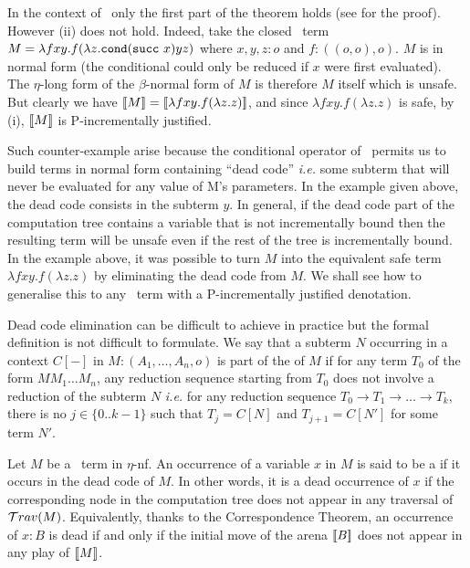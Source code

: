 In the context of \pcf\, only the first part of the theorem holds (see \cite{blumtransfer} for the proof). However (ii) does not hold. Indeed, take the closed \pcf\ term $M = \lambda f x y. f (\lambda z. \texttt{cond} (\texttt{succ}\ x) y z )$ where $x,y,z:o$ and $f:((o,o),o)$. $M$ is in normal form (the conditional  could  only be reduced if $x$ were first evaluated). The $\eta$-long form of the $\beta$-normal form of $M$ is therefore $M$ itself which is unsafe.
But clearly we have ${[\![ M ]\!]} = {[\![ \lambda f x y. f (\lambda z. z) ]\!]}$, and since  $\lambda f x y. f (\lambda z. z)$ is safe, by (i), ${[\![ M ]\!]}$ is P-incrementally justified.

Such counter-example arise because the conditional operator of \pcf\ permits us to build terms in normal form containing ``dead code'' {\it i.e.} some  subterm that will never be evaluated for any value of M's parameters. In the example given above, the dead code consists in the subterm $y$. In general, if the dead code part of the computation tree contains a variable that is not incrementally bound then the resulting term will be unsafe even if the rest of the tree is incrementally bound.
In the example above, it was possible to turn $M$ into the equivalent safe term $\lambda f x y. f (\lambda z. z)$ by eliminating the dead code from $M$.
We shall see how to generalise this to any \pcf\ term with a P-incrementally justified denotation.

Dead code elimination can be difficult to achieve in practice but the formal definition is not difficult to formulate. We say that a subterm $N$ occurring
in a context $C[-]$ in $M : (A_1, \ldots, A_n,o)$ is part of the  of $M$ if for any term $T_0$ of the form $M M_1 \ldots M_n$,
any reduction sequence starting from $T_0$ does not involve a reduction of the subterm $N$ {\it i.e.} for any reduction sequence $T_0 \rightarrow T_1 \rightarrow \ldots \rightarrow T_k$, there is no $j\in \{0.. k-1\}$ such that $T_j = C[N]$ and $T_{j+1} = C[N']$ for some term $N'$.


Let $M$  be a \pcf\ term in $\eta$-nf.
An occurrence of a variable $x$ in $M$ is said to be a 
if it occurs in the dead code of $M$. In other words, it is a
dead occurrence of $x$ if the corresponding node in the computation tree does not appear in any traversal of $\mathcal{T}rav(M)$. Equivalently, thanks to the Correspondence Theorem, an occurrence of $x:B$ is dead if and only if the initial move
of the arena ${[\![ B ]\!]}$ does not appear in any play of ${[\![ M ]\!]}$.



